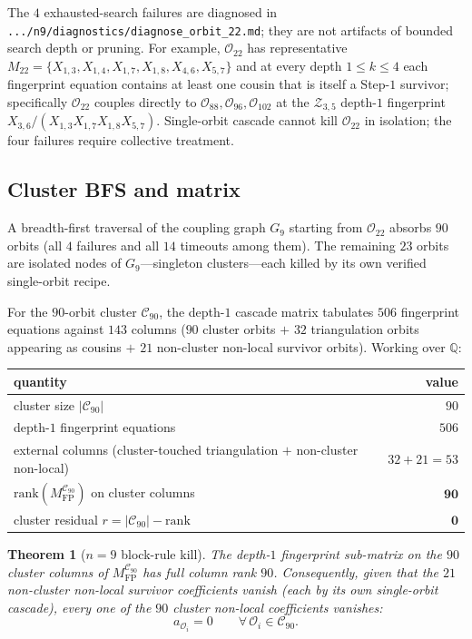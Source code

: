 \documentclass[11pt]{article}
\newtheorem{thm}{Theorem}
\theoremstyle{definition}
\begin{document}
The $4$ exhausted-search failures are diagnosed in
\verb|.../n9/diagnostics/diagnose_orbit_22.md|; they are not
artifacts of bounded search depth or pruning. For example,
$\mathcal O_{22}$ has representative
$M_{22}=\{X_{1,3},X_{1,4},X_{1,7},X_{1,8},X_{4,6},X_{5,7}\}$ and at
every depth $1\le k\le 4$ each fingerprint equation contains at
least one cousin that is itself a Step-$1$ survivor; specifically
$\mathcal O_{22}$ couples directly to
$\mathcal O_{88},\mathcal O_{96},\mathcal O_{102}$ at the
$\mathcal Z_{3,5}$ depth-$1$ fingerprint
$X_{3,6}/(X_{1,3}X_{1,7}X_{1,8}X_{5,7})$. Single-orbit cascade
cannot kill $\mathcal O_{22}$ in isolation; the four failures
require collective treatment.

\subsection{Cluster BFS and matrix}\label{subsec:cluster}

A breadth-first traversal of the coupling graph $G_9$ starting from
$\mathcal O_{22}$ absorbs $90$ orbits (all $4$ failures and all $14$
timeouts among them). The remaining $23$ orbits are isolated nodes
of $G_9$---singleton clusters---each killed by its own verified
single-orbit recipe.

For the $90$-orbit cluster $\mathcal C_{90}$, the depth-$1$ cascade
matrix tabulates $506$ fingerprint equations against $143$ columns
($90$ cluster orbits $+$ $32$ triangulation orbits appearing as
cousins $+$ $21$ non-cluster non-local survivor orbits). Working
over $\mathbb Q$:

\begin{center}\small
\begin{tabular}{lr}
\toprule
quantity & value\\
\midrule
cluster size $|\mathcal C_{90}|$ & $90$\\
depth-$1$ fingerprint equations & $506$\\
external columns (cluster-touched triangulation $+$ non-cluster non-local) & $32+21=53$\\
$\mathrm{rank}(M_{\mathrm{FP}}^{\mathcal C_{90}})$ on cluster columns & $\boldsymbol{90}$\\
cluster residual $r=|\mathcal C_{90}|-\mathrm{rank}$ & $\boldsymbol{0}$\\
\bottomrule
\end{tabular}
\end{center}

\begin{thm}[$n=9$ block-rule kill]\label{thm:n9-blockkill}
The depth-$1$ fingerprint sub-matrix on the $90$ cluster columns of
$M_{\mathrm{FP}}^{\mathcal C_{90}}$ has full column rank $90$.
Consequently, given that the $21$ non-cluster non-local survivor
coefficients vanish (each by its own single-orbit cascade), every
one of the $90$ cluster non-local coefficients vanishes:
\[
   a_{\mathcal O_i}=0 \qquad\forall\,\mathcal O_i\in\mathcal C_{90}.
\]
\end{thm}
\end{document}
